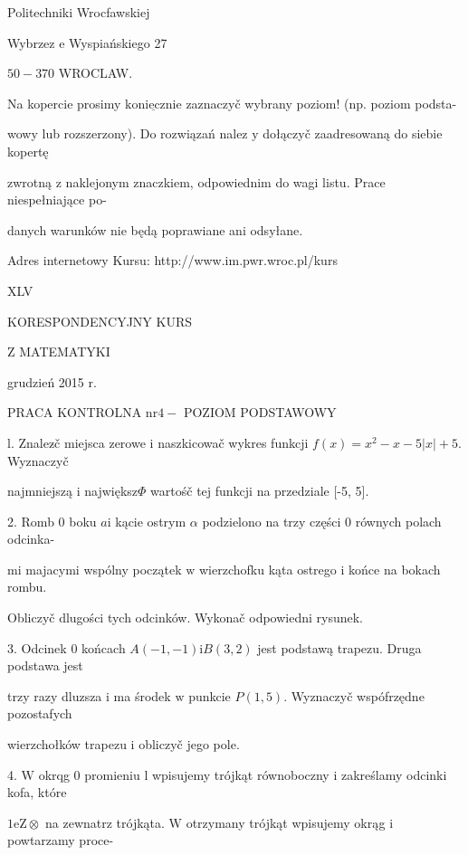 \documentclass[a4paper,12pt]{article}
\begin{document}
Politechniki Wrocfawskiej

Wybrzez $\mathrm{e}$ Wyspiańskiego 27

$50-370$ WROCLAW.

Na kopercie prosimy $\underline{\mathrm{k}\mathrm{o}\mathrm{n}\mathrm{i}\mathrm{e}\mathrm{c}\mathrm{z}\mathrm{n}\mathrm{i}\mathrm{e}}$ zaznaczyč wybrany poziom! (np. poziom podsta-

wowy lub rozszerzony). Do rozwiązań nalez $\mathrm{y}$ dołączyč zaadresowaną do siebie kopertę

zwrotną $\mathrm{z}$ naklejonym znaczkiem, odpowiednim do wagi listu. Prace niespełniające po-

danych warunków nie będą poprawiane ani odsyłane.

Adres internetowy Kursu: http://www.im.pwr.wroc.pl/kurs







XLV

KORESPONDENCYJNY KURS

Z MATEMATYKI

grudzień 2015 r.

PRACA KONTROLNA $\mathrm{n}\mathrm{r} 4-$ POZIOM PODSTAWOWY

l. Znalez$\acute{}$č miejsca zerowe $\mathrm{i}$ naszkicowač wykres funkcji $f(x)=x^{2}-x-5|x|+5$. Wyznaczyč

najmniejszą $\mathrm{i}$ największ$\Phi$ wartośč tej funkcji na przedziale [-5, 5].

2. Romb $0$ boku $a\mathrm{i}$ kącie ostrym $\alpha$ podzielono na trzy części $0$ równych polach odcinka-

mi majacymi wspólny początek $\mathrm{w}$ wierzchofku kąta ostrego $\mathrm{i}$ końce na bokach rombu.

Obliczyč dlugości tych odcinków. Wykonač odpowiedni rysunek.

3. Odcinek $0$ końcach $A(-1,-1) \mathrm{i} B(3,2)$ jest podstawą trapezu. Druga podstawa jest

trzy razy dluzsza $\mathrm{i}$ ma środek $\mathrm{w}$ punkcie $P(1,5)$. Wyznaczyč wspófrzędne pozostafych

wierzchołków trapezu $\mathrm{i}$ obliczyč jego pole.

4. $\mathrm{W}$ okrqg $0$ promieniu l wpisujemy trójkąt równoboczny $\mathrm{i}$ zakreślamy odcinki kofa, które

$ 1\mathrm{e}\mathrm{Z}\otimes$ na zewnatrz trójkąta. $\mathrm{W}$ otrzymany trójkąt wpisujemy okrąg $\mathrm{i}$ powtarzamy proce-
\end{document}
